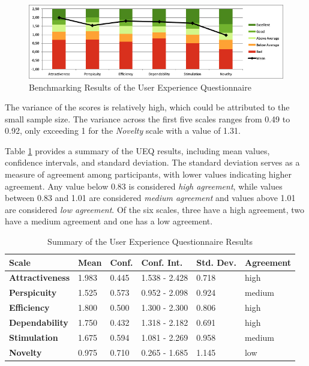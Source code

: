 \begin{figure}[htb]
	\includegraphics[width=\textwidth]{figures/ueq-2.png}
  \caption{Benchmarking Results of the User Experience Questionnaire}
  \label{fig:ueq-2}
\end{figure}

The variance of the scores is relatively high, which could be attributed to the small sample size.
The variance across the first five scales ranges from 0.49 to 0.92, only exceeding 1 for the \emph{Novelty} scale with a value of 1.31.

Table \ref{tab:ueq-summary} provides a summary of the UEQ results, including mean values, confidence intervals, and standard deviation.
The standard deviation serves as a measure of agreement among participants, with lower values indicating higher agreement.
Any value below 0.83 is considered \emph{high agreement}, while values between 0.83 and 1.01 are considered \emph{medium agreement} and values above 1.01 are considered \emph{low agreement}.
Of the six scales, three have a high agreement, two have a medium agreement and one has a low agreement.

\begin{table}[htb]
  \centering
  \begin{tabularx}{\textwidth}{|X|l|l|l|l|l|}
  \hline
      \textbf{Scale} &  \textbf{Mean}  &  \textbf{Conf.} &  \textbf{Conf. Int.} &  \textbf{Std. Dev.} & \textbf{Agreement}\\ \hline
      \textbf{Attractiveness} & 1.983  & 0.445 & 1.538 - 2.428 & 0.718 & high \\ \hline
      \textbf{Perspicuity} & 1.525 & 0.573 & 0.952 - 2.098 & 0.924 & medium\\ \hline
      \textbf{Efficiency} & 1.800 & 0.500 & 1.300 - 2.300 & 0.806 & high \\ \hline
      \textbf{Dependability} & 1.750 & 0.432 & 1.318 - 2.182 & 0.691 & high \\ \hline
      \textbf{Stimulation} & 1.675 & 0.594 & 1.081 - 2.269 & 0.958 & medium \\ \hline
      \textbf{Novelty} & 0.975 & 0.710 & 0.265 - 1.685 & 1.145 & low \\ \hline
  \end{tabularx}
  \vspace{6pt}
  \caption{Summary of the User Experience Questionnaire Results}
  \label{tab:ueq-summary}
\end{table}

